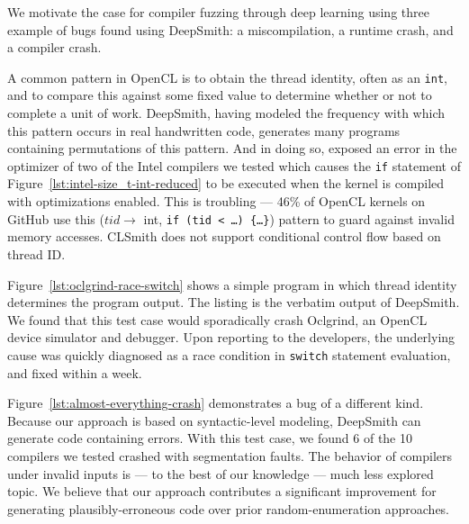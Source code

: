 We motivate the case for compiler fuzzing through deep learning using three example of bugs found using DeepSmith: a miscompilation, a runtime crash, and a compiler crash.

A common pattern in OpenCL is to obtain the thread identity, often as an \texttt{int}, and to compare this against some fixed value to determine whether or not to complete a unit of work. DeepSmith, having modeled the frequency with which this pattern occurs in real handwritten code, generates many programs containing permutations of this pattern. And in doing so, exposed an error in the optimizer of two of the Intel compilers we tested
which causes the \texttt{if} statement of Figure~\ref{lst:intel-size_t-int-reduced} to be executed when the kernel is compiled with optimizations enabled.
%
This is troubling --- 46\% of OpenCL kernels on GitHub use this ($tid \rightarrow$ int, \texttt{if (tid < \ldots) \{\ldots\}}) pattern to guard against invalid memory accesses. CLSmith does not support conditional control flow based on thread ID. %

Figure~\ref{lst:oclgrind-race-switch} shows a simple program in which thread identity determines the program output. The listing is the verbatim output of DeepSmith. We found that this test case would sporadically crash Oclgrind, an OpenCL device simulator and debugger. Upon reporting to the developers, the underlying cause was quickly diagnosed as a race condition in \texttt{switch} statement evaluation, and fixed within a week.

Figure~\ref{lst:almost-everything-crash} demonstrates a bug of a different kind. Because our approach is based on syntactic-level modeling, DeepSmith can generate code containing errors. With this test case, we found 6 of the 10 compilers we tested crashed with segmentation faults. The behavior of compilers under invalid inputs is --- to the best of our knowledge --- much less explored topic. We believe that our approach contributes a significant improvement for generating plausibly-erroneous code over prior random-enumeration approaches.
